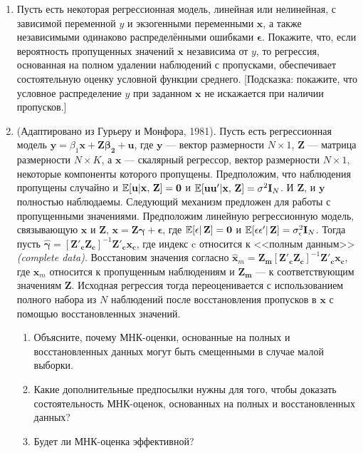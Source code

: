 \begin{enumerate}
\item Пусть есть некоторая регрессионная модель, линейная или нелинейная, с зависимой переменной $y$ и экзогенными переменными $\mathbf{x}$, а также независимыми одинаково распределёнными ошибками $\mathbf{\epsilon}$. Покажите, что, если вероятность пропущенных значений $\mathbf{x}$ независима от $y$, то регрессия, основанная на полном удалении наблюдений с пропусками, обеспечивает состоятельную оценку условной функции среднего. [Подсказка: покажите, что условное распределение $y$ при заданном $\mathbf{x}$ не искажается при наличии пропусков.]

\item (Адаптировано из Гурьеру и Монфора, 1981). Пусть есть регрессионная модель $\mathbf{y}=\beta_1\mathbf{x}+\mathbf{Z\beta_2} + \mathbf{u}$, где $\mathbf{y}$ --– вектор размерности $N \times 1$, $\mathbf{Z}$ --– матрица размерности $N \times K$, а $\mathbf{x}$ --– скалярный регрессор, вектор размерности $N \times 1$, некоторые компоненты которого пропущены. Предположим, что наблюдения пропущены случайно и $\mathbb{E}[\mathbf{u}|\mathbf{x, \, Z}]=\mathbf{0}$ и $\mathbb{E}[\mathbf{uu'}|\mathbf{x, \, Z}]=\sigma^2\mathbf{I}_N$. И $\mathbf{Z}$, и $\mathbf{y}$ полностью наблюдаемы. Следующий механизм предложен для работы с пропущенными значениями. Предположим линейную регрессионную модель, связывающую $\mathbf{x}$ и $\mathbf{Z}$, $\mathbf{x}=\mathbf{Z\gamma}+ \mathbf{\epsilon}$, где $\mathbb{E}[\mathbf{\epsilon}| \, \mathbf{Z}]=\mathbf{0}$ и $\mathbb{E}[\mathbf{\epsilon \epsilon'}| \, \mathbf{Z}]=\sigma^2_{\epsilon}\mathbf{I}_N$. Тогда пусть $\widehat{\mathbf{\gamma}}=[\mathbf{Z'_c Z_c}]^{-1}\mathbf{Z'_c x_c}$, где индекс c относится к <<полным данным>> \emph{(complete data)}. Восстановим значения согласно $\widehat{\mathbf{x}}_m=\mathbf{Z_m}[\mathbf{Z'_c Z_c}]^{-1}\mathbf{Z'_c x_c}$, где $\mathbf{x}_m$ относится к пропущенным наблюдениям и $\mathbf{Z_m}$ –-- к соответствующим значениям $\mathbf{Z}$. Исходная регрессия тогда переоценивается с использованием полного набора из $N$ наблюдений после восстановления пропусков в $\mathbf{x}$ с помощью восстановленных значений.
\begin{enumerate}
\item	Объясните, почему МНК-оценки, основанные на полных и восстановленных данных могут быть смещенными в случае малой выборки.
\item	Какие дополнительные предпосылки нужны для того, чтобы доказать состоятельность МНК-оценок, основанных на полных и восстановленных данных?
\item	Будет ли МНК-оценка эффективной?
\end{enumerate}


\end{enumerate}
